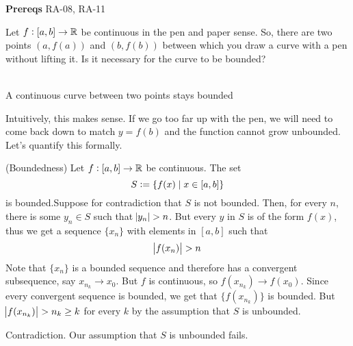 

\textbf{Prereqs} RA-08, RA-11

Let $f:[a, b] \rightarrow \mathbb{R}$ be continuous in the pen and paper sense. So, there are two points $(a, f(a))$ and $(b, f(b))$ between which you draw a curve with a pen without lifting it. Is it necessary for the curve to be bounded?

\begin{center}
\\
A continuous curve between two points stays bounded
\end{center}

Intuitively, this makes sense. If we go too far up with the pen, we will need to come back down to match $y = f(b)$ and the function cannot grow unbounded. Let's quantify this formally.

\begin{SWP}{\thm}{(Boundedness) Let $f: [a, b] \rightarrow \mathbb{R}$ be continuous. The set $$S := \{f(x) \space \mid \space x \in [a, b]\}$$is bounded.}Suppose for contradiction that $S$ is not bounded. Then, for every $n$, there is some $y_n \in S$ such that $\abs{y_n} > n$. But every $y$ in $S$ is of the form $f(x)$, thus we get a sequence $\{x_n\}$ with elements in $[a, b]$ such that
$$
\abs{f(x_n)} > n
$$
Note that $\{x_n\}$ is a bounded sequence and therefore has a convergent subsequence, say $x_{n_k} \rightarrow x_0$. But $f$ is continuous, so $f(x_{n_k}) \rightarrow f(x_0)$. Since every convergent sequence is bounded, we get that $\{f(x_{n_k})\}$ is bounded. But $\abs{f(x_{n_k})} > n_k \geq k$ for every $k$ by the assumption that $S$ is unbounded.

Contradiction. Our assumption that $S$ is unbounded fails.
\end{SWP}

